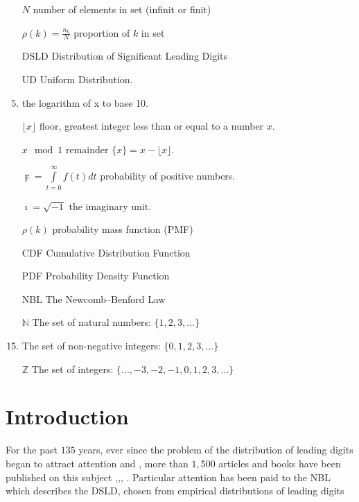 \documentclass[titlepage,fleqn]{article}%
\begin{document}
\begin{enumerate}[align=right]
\item[$N$]  number of elements  in set (infinit or finit)
\item[$\rho(k)=\frac{n_k}{N}$]  proportion of  $k$  in set
\item[DSLD] Distribution of Significant Leading Digits
\item[UD] Uniform Distribution.
\item[$\displaystyle\log{x}=\frac{\ln{x}}{\ln{10}}%
$] the logarithm of x to base 10.
\item[$\displaystyle\lfloor{x}\rfloor
$] floor, greatest integer less than or equal to a number $x$.
\item[$x\mod{}1$]  remainder
$\{x\}=x-\lfloor{x}\rfloor$.
\item[$\digamma=\int\limits_{t=0}^\infty
f(t) dt$]  probability of positive numbers.
\item[$\imath=\sqrt{-1}$]  the imaginary unit.
\item[$\rho(k)$]  probability mass function (PMF)
\item[CDF]  Cumulative Distribution Function
\item[PDF]  Probability Density Function
\item[NBL]  The Newcomb--Benford Law \cite{formann0}
\item[$\mathbb{N}$] The set of natural numbers: $\{1, 2, 3, . . .\}$
\item[$\mathbb{Z}^{*}%
$] The set of non-negative integers: $\{0,1, 2, 3, . . .\}$
\item[$\mathbb{Z}$] The set of integers: $\{...,-3,-2,-1,0,1, 2, 3, . . .\}$
\end{enumerate}


\section{Introduction}%

\label{introduction}%




For the past $135$ years, ever since the problem of the distribution of
leading digits began to attract attention
\cite{newcombs}  and \cite{benford}%
, more than $1,500$ articles and books have been published on this subject
\cite{hill},\cite{bergerhill},\cite{arnotheodore},\cite{miller}%
. Particular attention has been paid to the NBL which describes the DSLD,
chosen from empirical distributions of leading digits%
\end{document}
